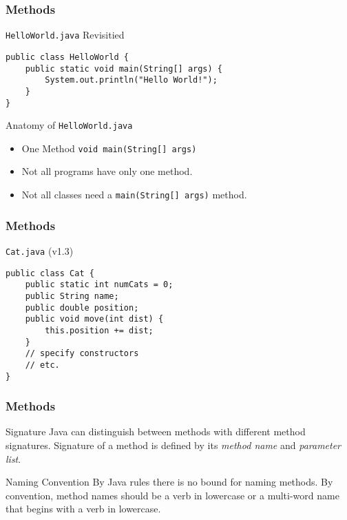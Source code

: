 \documentclass[10pt, compress]{beamer}
\begin{document}
\begin{frame}[fragile]
	\frametitle{Methods}
	\begin{block}{\texttt{HelloWorld.java} Revisitied}
		\begin{verbatim}
public class HelloWorld {
	public static void main(String[] args) {
		System.out.println("Hello World!");
	}
}
		\end{verbatim}
	\end{block}
	\begin{block}{Anatomy of \texttt{HelloWorld.java}}
		\begin{itemize}
			\item[] One Method \texttt{void main(String[] args)}
			\item[] Not all programs have only one method.
			\item[] Not all classes need a \texttt{main(String[] args)} method.
		\end{itemize}
	\end{block}
\end{frame}

\begin{frame}[fragile]
	\frametitle{Methods}
	\begin{block}{\texttt{Cat.java} (v1.3)}
		\begin{verbatim}
public class Cat {
	public static int numCats = 0;
	public String name;
	public double position;
	public void move(int dist) {
		this.position += dist;
	}
	// specify constructors
	// etc.
}
		\end{verbatim}
	\end{block}
\end{frame}

\begin{frame}[fragile]
	\frametitle{Methods}
	\begin{block}{Signature}
		Java can distinguish between methods with different method signatures. Signature of a method is defined by its \emph{method name} and \emph{parameter list}.
	\end{block}
	\begin{block}{Naming Convention}
		By Java rules there is no bound for naming methods. By convention, method names should be a verb in lowercase or a multi-word name that begins with a verb in lowercase.
	\end{block}
\end{frame}

\end{document}
